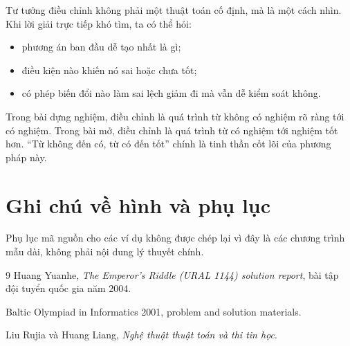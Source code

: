 \documentclass[11pt]{article}
\begin{document}
Tư tưởng điều chỉnh không phải một thuật toán cố định, mà là một cách nhìn.
Khi lời giải trực tiếp khó tìm, ta có thể hỏi:
\begin{itemize}
  \item phương án ban đầu dễ tạo nhất là gì;
  \item điều kiện nào khiến nó sai hoặc chưa tốt;
  \item có phép biến đổi nào làm sai lệch giảm đi mà vẫn dễ kiểm soát không.
\end{itemize}

Trong bài dựng nghiệm, điều chỉnh là quá trình từ không có nghiệm rõ ràng tới
có nghiệm. Trong bài mở, điều chỉnh là quá trình từ có nghiệm tới nghiệm tốt
hơn. ``Từ không đến có, từ có đến tốt'' chính là tinh thần cốt lõi của phương
pháp này.

\section*{Ghi chú về hình và phụ lục}

Phụ lục mã nguồn cho các ví dụ không được chép lại vì đây là các chương trình
mẫu dài, không phải nội dung lý thuyết chính.

\begin{thebibliography}{9}
Huang Yuanhe, \textit{The Emperor's Riddle (URAL 1144) solution report},
bài tập đội tuyển quốc gia năm 2004.

Baltic Olympiad in Informatics 2001, problem and solution materials.

Liu Rujia và Huang Liang, \textit{Nghệ thuật thuật toán và thi tin học}.
\end{thebibliography}
\end{document}
